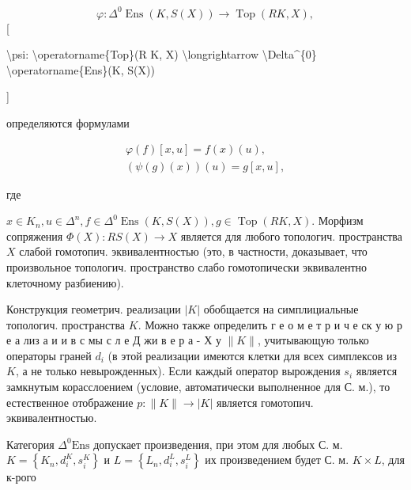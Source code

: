 \documentclass[10pt]{article}
\begin{document}
\[

\varphi: \Delta^{0} \operatorname{Ens}(K, S(X)) \rightarrow \operatorname{Top}(R K, X),

\][



\textbackslash psi: \textbackslash operatorname\{Top\}(R K, X) \textbackslash longrightarrow \textbackslash Delta\^{}\{0\} \textbackslash operatorname\{Ens\}(K, S(X))

]



определяются формулами



\[

\begin{gathered}

\varphi(f)[x, u]=f(x)(u), \\

(\psi(g)(x))(u)=g[x, u],

\end{gathered}

\]



где



$x \in K_{n}, u \in \Delta^{n}, f \in \Delta^{0} \operatorname{Ens}(K, S(X)), g \in \operatorname{Top}(R K, X)$. Морфизм сопряжения $\Phi(X): R S(X) \rightarrow X$ является для любого топологич. пространства $X$ слабой гомотопич. эквивалентностью (это, в частности, доказывает, что произвольное топологич. пространство слабо гомотопически эквивалентно клеточному разбиению).



Конструкция геометрич. реализации $|K|$ обобщается на симплициальные топологич. пространства $K$. Можно также определить г е о м е т р и ч е ск у ю р е а лиз а и и в с мы с л е Д жи в е р а - Х у $\|K\|$, учитывающую только операторы граней $d_{i}$ (в этой реализации имеются клетки для всех симплексов из $K$, а не только невырожденных). Если каждый оператор вырождения $s_{i}$ является замкнутым корасслоением (условие, автоматически выполненное для С. м.), то естественное отображение $p:\|K\| \rightarrow|K|$ является гомотопич. эквивалентностью.



Категория $\Delta^{0} \mathrm{Ens}$ допускает произведения, при этом для любых С. м. $K=\left\{K_{n}, d_{i}^{K}, s_{i}^{K}\right\}$ и $L=\left\{L_{n}, d_{i}^{L}, s_{i}^{L}\right\}$ их произведением будет С. м. $K \times L$, для к-рого
\end{document}
